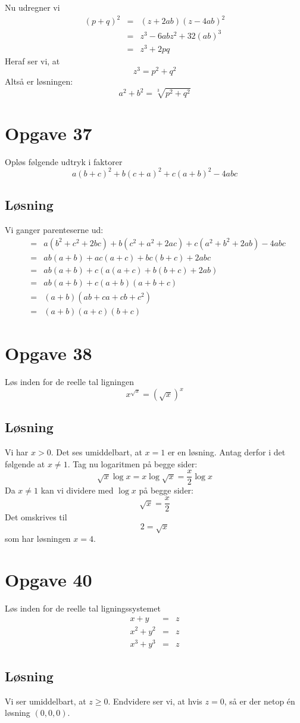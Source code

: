 \documentclass[12pt,oneside,a4paper]{article}
\newcommand{\bas}{\begin{eqnarray*}}
\newcommand{\eas}{\end{eqnarray*}}
\begin{document}
Nu udregner vi
\bas
(p+q)^2 &=& (z+2ab) (z-4ab)^2 \\
        &=& z^3-6abz^2+32(ab)^3 \\
        &=& z^3+2pq
\eas
Heraf ser vi, at 
$$
z^3 = p^2+q^2
$$
Altså er løsningen:
$$
a^2+b^2 = \sqrt[3]{p^2+q^2}
$$

\section{Opgave 37}
Opløs følgende udtryk i faktorer
$$
a(b+c)^2+b(c+a)^2+c(a+b)^2-4abc
$$

\subsection{Løsning}
Vi ganger parenteserne ud:
\bas
&=& a(b^2+c^2+2bc) + b(c^2+a^2+2ac) + c(a^2+b^2+2ab)-4abc \\
&=& ab(a+b)+ac(a+c)+bc(b+c)+2abc \\
&=& ab(a+b) + c\left(a(a+c)+b(b+c)+2ab\right) \\
&=& ab(a+b) + c(a+b)(a+b+c) \\
&=& (a+b)(ab+ca+cb+c^2) \\
&=& (a+b)(a+c)(b+c)
\eas


\section{Opgave 38}
Løs inden for de reelle tal ligningen
$$
x^{\sqrt x} = \left(\sqrt x\right)^x
$$

\subsection{Løsning}
Vi har $x>0$. Det ses umiddelbart, at $x=1$ er en løsning. Antag derfor i det følgende at $x\neq 1$. Tag nu logaritmen på begge sider:
$$
\sqrt x \log x = x \log\sqrt x = \frac x2 \log x
$$
Da $x\neq 1$ kan vi dividere med $\log x$ på begge sider:
$$
\sqrt x = \frac x2
$$
Det omskrives til
$$
2 = \sqrt x
$$
som har løsningen $x=4$.


\section{Opgave 40}
Løs inden for de reelle tal ligningssystemet
\bas
x+y &=& z \\
x^2+y^2 &=& z \\
x^3+y^3 &=& z
\eas

\subsection{Løsning}
Vi ser umiddelbart, at $z \ge 0$. Endvidere ser vi, at hvis $z=0$, så er der netop én løsning $(0, 0, 0)$.
\end{document}
